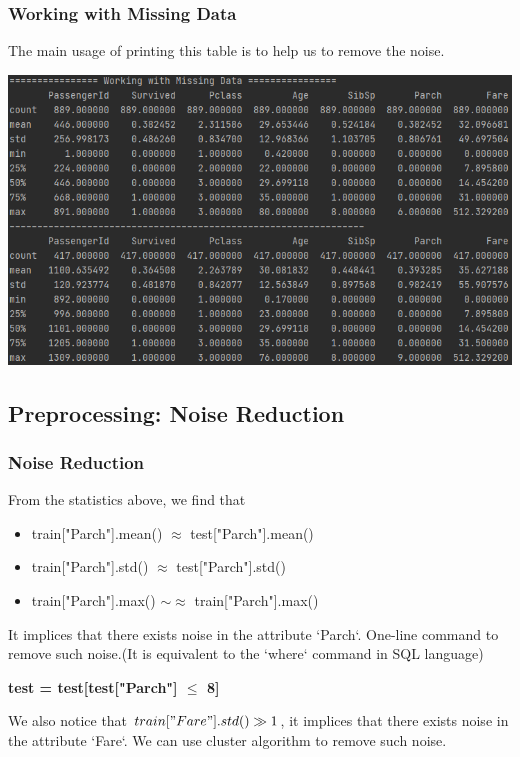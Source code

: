 \documentclass{beamer}
\begin{document}
\begin{frame}
	\frametitle{Working with Missing Data}
	\begin{flushleft}
		The main usage of printing this table is to help us to remove the noise.
	\end{flushleft}
	\begin{center}
		\includegraphics[width=0.9\linewidth]{./src/figures/2.png}
	\end{center}
\end{frame}

\subsection{Preprocessing: Noise Reduction}
\begin{frame}
	\frametitle{Noise Reduction}
	\begin{flushleft}
		From the statistics above, we find that
		\begin{itemize}
			\item train["Parch"].mean() $\approx$ test["Parch"].mean()
            \item train["Parch"].std() $\approx$ test["Parch"].std()
            \item train["Parch"].max() $\sim \approx$ train["Parch"].max()
		\end{itemize}
		It implices that there exists noise in the attribute `Parch`. One-line command to remove such noise.(It is equivalent to the `where` command in SQL language)
	\end{flushleft}
	\begin{center}
		\textbf{\color{blue}test = test[test["Parch"] $\le$ 8]}
	\end{center}
	\begin{flushleft}
		We also notice that $train["Fare"].std() \gg 1$, it implices that there exists noise in the attribute `Fare`. We can use cluster algorithm to remove such noise.
	\end{flushleft}
\end{frame}
\end{document}
